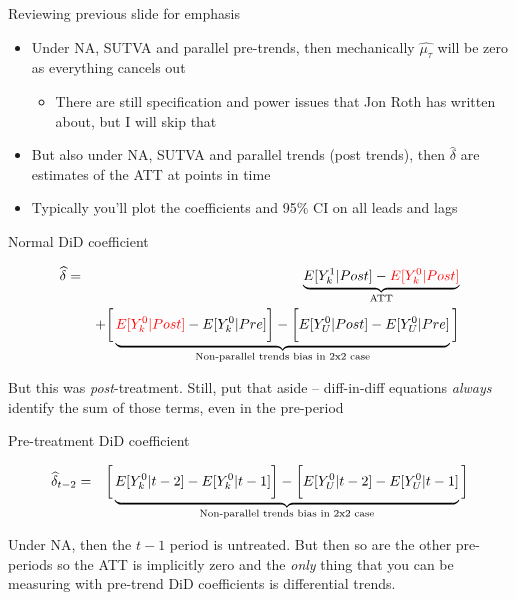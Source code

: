 \documentclass{beamer}
\begin{document}
\begin{frame}{Reviewing previous slide for emphasis}


\begin{itemize}
\item Under NA, SUTVA and parallel pre-trends, then mechanically $\widehat{\mu_{\tau}}$ will be zero as everything cancels out
	\begin{itemize}
\item There are still specification and power issues that Jon Roth has written about, but I will skip that
	\end{itemize}
\item But also under NA, SUTVA and parallel trends (post trends), then $\widehat{\delta}$ are estimates of the ATT at points in time
\item  Typically you'll plot the coefficients and 95\% CI on all leads and lags
\end{itemize}

\end{frame}

\begin{frame}{Normal DiD coefficient}

\begin{eqnarray*}
\widehat{\delta} &=& \underbrace{E[Y^1_k | Post] - \textcolor{red}{E[Y^0_k | Post]}}_{\mathclap{\text{ATT}}} \\
&& + \bigg [  \underbrace{\textcolor{red}{E[Y^0_k | Post]} - E[Y^0_k | Pre] \bigg ] - \bigg [ E[Y^0_U | Post] - E[Y_U^0 | Pre] }_{\mathclap{\text{Non-parallel trends bias in 2x2 case}}} \bigg ]
\end{eqnarray*}

\bigskip

But this was \emph{post}-treatment.  Still, put that aside -- diff-in-diff equations \emph{always} identify the sum of those terms, even in the pre-period


\end{frame}

\begin{frame}{Pre-treatment DiD coefficient}

\begin{eqnarray*}
\widehat{\delta}_{t-2} &=& \bigg [  \underbrace{\textcolor{black}{E[Y^0_k | t-2]} - E[Y^0_k | t-1] \bigg ] - \bigg [ E[Y^0_U | t-2] - E[Y_U^0 | t-1] }_{\mathclap{\text{Non-parallel trends bias in 2x2 case}}} \bigg ]
\end{eqnarray*}

\bigskip

Under NA, then the $t-1$ period is untreated.  But then so are the other pre-periods so the ATT is implicitly zero and the \emph{only} thing that you can be measuring with pre-trend DiD coefficients is differential trends.  


\end{frame}
\end{document}
